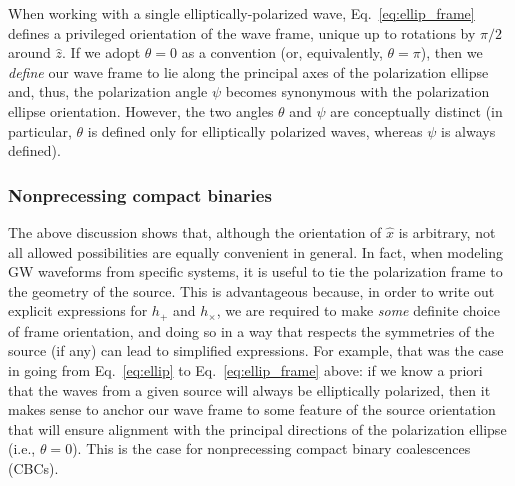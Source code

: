 \documentclass[aps,prd,twocolumn,superscriptaddress,preprintnumbers,floatfix,nofootinbib]{revtex4-2}
\begin{document}
When working with a single elliptically-polarized wave, Eq.~\eqref{eq:ellip_frame} defines a privileged orientation of the wave frame, unique up to rotations by $\pi/2$ around $\hat{z}$.
If we adopt $\theta =0$ as a convention (or, equivalently, $\theta=\pi$), then we \emph{define} our wave frame to lie along the principal axes of the polarization ellipse and, thus, the polarization angle $\psi$ becomes synonymous with the polarization ellipse orientation.
However, the two angles $\theta$ and $\psi$ are conceptually distinct (in particular, $\theta$ is defined only for elliptically polarized waves, whereas $\psi$ is always defined).


\subsubsection*{Nonprecessing compact binaries}

The above discussion shows that, although the orientation of $\hat{x}$ is arbitrary, not all allowed possibilities are equally convenient in general. 
In fact, when modeling GW waveforms from specific systems, it is useful to tie the polarization frame to the geometry of the source.
This is advantageous because, in order to write out explicit expressions for $h_+$ and $h_\times$, we are required to make \emph{some} definite choice of frame orientation, and doing so in a way that respects the symmetries of the source (if any) can lead to simplified expressions.
For example, that was the case in going from Eq.~\eqref{eq:ellip} to Eq.~\eqref{eq:ellip_frame} above: if we know a priori that the waves from a given source will always be elliptically polarized, then it makes sense to anchor our wave frame to some feature of the source orientation that will ensure alignment with the principal directions of the polarization ellipse (i.e., $\theta=0$).
This is the case for nonprecessing compact binary coalescences (CBCs).
\end{document}
